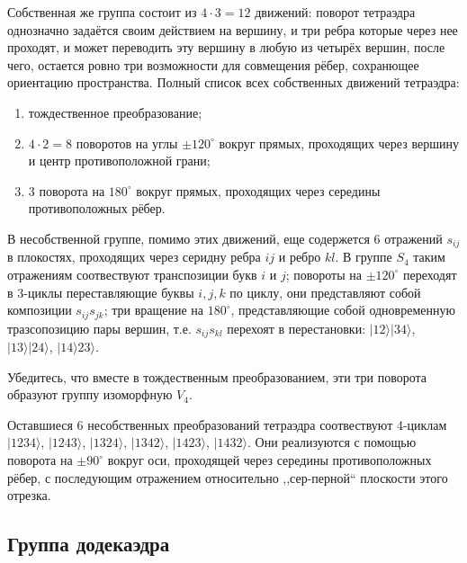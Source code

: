 Собственная же группа состоит из $4 \cdot 3 = 12$ движений: поворот тетраэдра однозначно задаётся своим действием на вершину, и три ребра которые через нее проходят, и может переводить эту вершину в любую из четырёх вершин, после чего, остается ровно три возможности для совмещения рёбер, сохранющее ориентацию пространства. Полный список всех собственных движений тетраэдра: 
\begin{enumerate}
    \item тождественное преобразование;
    \item $4\cdot 2 = 8$ поворотов на углы $\pm 120^\circ$ вокруг прямых, проходящих через вершину и центр противоположной грани;
    \item 3 поворота на $180^\circ$ вокруг прямых, проходящих через середины противоположных рёбер.
\end{enumerate}

В несобственной группе, помимо этих движений, еще содержется 6 отражений $s_{ij}$ в плокостях, проходящих через серидну ребра $ij$ и ребро $kl$. В группе $S_4$ таким отражениям соотвествуют транспозиции букв $i$ и $j$; повороты на $\pm 120^\circ$ переходят в 3-циклы переставляющие буквы $i,j,k$ по циклу, они представляют собой композиции $s_{ij}s_{jk}$; три вращение на $180^\circ$, представляющие собой одновременную тразсопозицию пары вершин, т.е. $s_{ij}s_{kl}$ перехоят в перестановки: $|12\rangle |34\rangle$, $|13\rangle |24\rangle$, $|14\rangle 23\rangle$.

\begin{practice}
    Убедитесь, что вместе в тождественным преобразованием, эти три поворота образуют группу изоморфную $V_4$.
\end{practice}

Оставшиеся 6 несобственных преобразований тетраэдра соотвествуют 4-циклам $|1234\rangle$, $| 1243 \rangle$, $|1324 \rangle $, $| 1342 \rangle $, $|1423 \rangle $, $| 1432 \rangle$. Они реализуются с помощью поворота на $\pm 90^\circ$ вокруг оси, проходящей через середины противоположных рёбер, с последующим отражением относительно ,,сер-перной`` плоскости этого отрезка.

\subsection{Группа додекаэдра}


